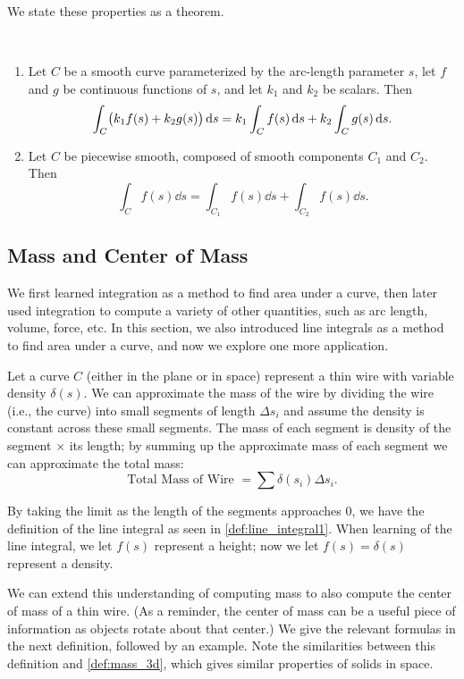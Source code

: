 We state these properties as a theorem.

\begin{theorem}\label{thm:line_int_properties_scalar}%
%
\mbox{}\\[-2\baselineskip]\parbox[t]{\linewidth}{\begin{enumerate}
	\item	Let $C$ be a smooth curve parameterized by the arc-length parameter $s$, let $f$ and $g$ be continuous functions of $s$, and let $k_1$ and $k_2$ be scalars. Then
\[\displaystyle \int_C\bigl(k_1f(s)+k_2g(s)\bigr)\operatorname{d}\! s = k_1\int_Cf(s)\operatorname{d}\! s +k_2\int_Cg(s)\operatorname{d}\! s.\]
	\item Let $C$ be piecewise smooth, composed of smooth components $C_1$ and $C_2$. Then
\[\int_Cf(s)\dd s = \int_{C_1}f(s)\dd s + \int_{C_2}f(s)\dd s.\]
\end{enumerate}}
\end{theorem}

\subsection{Mass and Center of Mass}

We first learned integration as a method to find area under a curve, then later used integration to compute a variety of other quantities, such as arc length, volume, force, etc. In this section, we also introduced line integrals as a method to find area under a curve, and now we explore one more application.

Let a curve $C$ (either in the plane or in space) represent a thin wire with variable density $\delta(s)$. We can approximate the mass of the wire by dividing the wire (i.e., the curve) into small segments of length $\Delta s_i$ and assume the density is constant across these small segments. The mass of each segment is density of the segment $\times$ its length; by summing up the approximate mass of each segment we can approximate the total mass:
\[\text{Total Mass of Wire } = \sum \delta(s_i)\Delta s_i.\]

By taking the limit as the length of the segments approaches 0, we have the definition of the line integral as seen in \autoref{def:line_integral1}. When learning of the line integral, we let $f(s)$ represent a height; now we let $f(s) = \delta(s)$ represent a density.

We can extend this understanding of computing mass to also compute the center of mass of a thin wire. (As a reminder, the center of mass can be a useful piece of information as objects rotate about that center.) We give the relevant formulas in the next definition, followed by an example. Note the similarities between this definition and \autoref{def:mass_3d}, which gives similar properties of solids in space.

